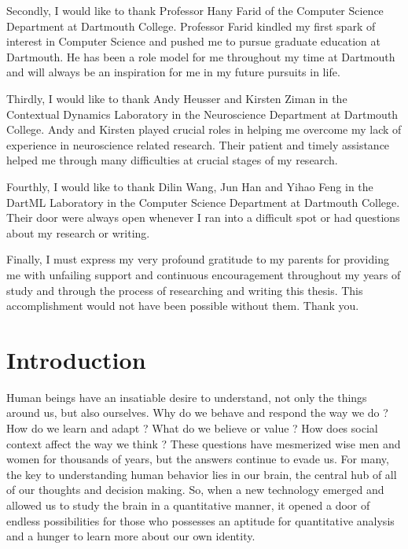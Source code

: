 \documentclass[11pt]{article}
\begin{document}
Secondly, I would like to thank Professor Hany Farid of the Computer Science Department at Dartmouth College. Professor Farid kindled my first spark of interest in Computer Science and pushed me to pursue graduate education at Dartmouth. He has been a role model for me throughout my time at Dartmouth and will always be an inspiration for me in my future pursuits in life.

Thirdly, I would like to thank Andy Heusser and Kirsten Ziman in the Contextual Dynamics Laboratory in the Neuroscience Department at Dartmouth College. Andy and Kirsten played crucial roles in helping me overcome my lack of experience in neuroscience related research. Their patient and timely assistance helped me through many difficulties at crucial stages of my research.

Fourthly, I would like to thank Dilin Wang, Jun Han and Yihao Feng in the DartML Laboratory in the Computer Science Department at Dartmouth College. Their door were always open whenever I ran into a difficult spot or had questions about my research or writing.

Finally, I must express my very profound gratitude to my parents for providing me with unfailing support and continuous encouragement throughout my years of study and through the process of researching and writing this thesis. This accomplishment would not have been possible without them. Thank you.

\newpage
\tableofcontents
\newpage
\listoffigures
\newpage
{}

\section{Introduction}
Human beings have an insatiable desire to understand, not only the things around us, but also ourselves. Why do we behave and respond the way we do \citep{hasson2012}? How do we learn and adapt \citep{hasson2004,hasson2005}? What do we believe or value \citep{Greene01}? How does social context affect the way we think \citep{Matthew2015}? These questions have mesmerized wise men and women for thousands of years, but the answers continue to evade us. For many, the key to understanding human behavior lies in our brain, the central hub of all of our thoughts and decision making. So, when a new technology emerged and allowed us to study the brain in a quantitative manner, it opened a door of endless possibilities for those who possesses an aptitude for quantitative analysis and a hunger to learn more about our own identity.
\end{document}
